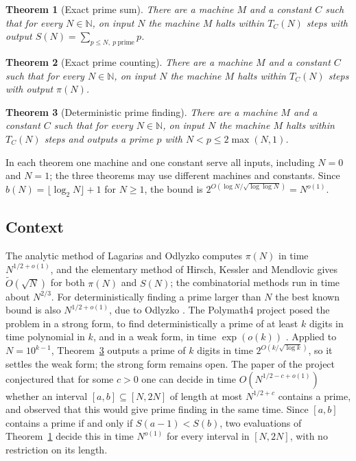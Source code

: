 \documentclass[11pt]{amsart}
\newtheorem{theorem}{Theorem}
\theoremstyle{remark}
\newcommand{\N}{\mathbb{N}}
\begin{document}
\begin{theorem}[Exact prime sum]\label{thm:sum}
There are a machine $M$ and a constant $C$ such that for every $N\in\N$, on
input $N$ the machine $M$ halts within $T_C(N)$ steps with output
$S(N)=\sum_{p\le N,\ p\ \mathrm{prime}}p$.
\end{theorem}

\begin{theorem}[Exact prime counting]\label{thm:count}
There are a machine $M$ and a constant $C$ such that for every $N\in\N$, on
input $N$ the machine $M$ halts within $T_C(N)$ steps with output $\pi(N)$.
\end{theorem}

\begin{theorem}[Deterministic prime finding]\label{thm:find}
There are a machine $M$ and a constant $C$ such that for every $N\in\N$, on
input $N$ the machine $M$ halts within $T_C(N)$ steps and outputs a prime $p$
with $N<p\le 2\max(N,1)$.
\end{theorem}

In each theorem one machine and one constant serve all inputs, including
$N=0$ and $N=1$; the three theorems may use different machines and constants.
Since $b(N)=\lfloor\log_2 N\rfloor+1$ for $N\ge1$, the bound is
$2^{O(\log N/\sqrt{\log\log N})}=N^{o(1)}$.

\subsection*{Context}
The analytic method of Lagarias and Odlyzko \cite{LO} computes $\pi(N)$ in
time $N^{1/2+o(1)}$, and the elementary method of Hirsch, Kessler and
Mendlovic \cite{HKM} gives $\widetilde O(\sqrt N)$ for both $\pi(N)$ and
$S(N)$; the combinatorial methods \cite{LMO,DR} run in time about $N^{2/3}$.
For deterministically finding a prime larger than $N$ the best known bound is
also $N^{1/2+o(1)}$, due to Odlyzko \cite{TCH}.  The Polymath4 project
posed the problem in a strong form, to find deterministically a prime of at
least $k$ digits in time polynomial in $k$, and in a weak form, in time
$\exp(o(k))$ \cite{P4}.  Applied to $N=10^{k-1}$, Theorem~\ref{thm:find}
outputs a prime of $k$ digits in time $2^{O(k/\sqrt{\log k})}$, so it settles
the weak form; the strong form remains open.  The paper of the project
\cite[Conjecture~1.1]{TCH} conjectured that for some $c>0$ one can decide in
time $O(N^{1/2-c+o(1)})$ whether an interval $[a,b]\subseteq[N,2N]$ of length
at most $N^{1/2+c}$ contains a prime, and observed that this would give
prime finding in the same time.  Since $[a,b]$ contains a prime if and only
if $S(a-1)<S(b)$, two evaluations of Theorem~\ref{thm:sum} decide this in
time $N^{o(1)}$ for every interval in $[N,2N]$, with no restriction on its
length.
\end{document}
